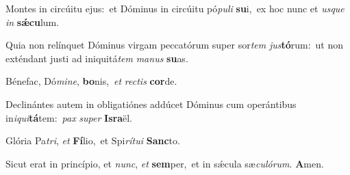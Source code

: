 Montes in circúitu ejus:~\reddagger et Dóminus in circúitu pó\textit{pu}\textit{li} \textbf{su}i,~\redgreheightstar ex hoc nunc et \textit{us}\textit{que} \textit{in} \textbf{sǽ}\textbf{cu}lum.

Quia non relínquet Dóminus virgam peccatórum super sor\textit{tem} \textit{jus}\textbf{tó}rum:~\redgreheightstar ut non exténdant justi ad iniquitá\textit{tem} \textit{ma}\textit{nus} \textbf{su}as.

Bénefac, Dó\textit{mi}\textit{ne}, \textbf{bo}nis,~\redgreheightstar \textit{et} \textit{rec}\textit{tis} \textbf{cor}de.

Declinántes autem in obligatiónes addúcet Dóminus cum operántibus in\textit{i}\textit{qui}\textbf{tá}tem:~\redgreheightstar \textit{pax} \textit{su}\textit{per} \textbf{Is}\textbf{ra}ël.

Glória Pa\textit{tri}, \textit{et} \textbf{Fí}lio,~\redgreheightstar et Spi\textit{rí}\textit{tu}\textit{i} \textbf{Sanc}to.

Sicut erat in princípio, et \textit{nunc}, \textit{et} \textbf{sem}per,~\redgreheightstar et in sǽcula sæ\textit{cu}\textit{ló}\textit{rum}. \textbf{A}men.
